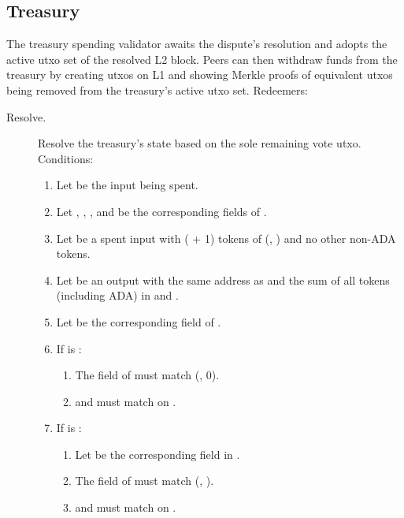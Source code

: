 \documentclass[../hydrozoa.tex]{subfiles}
\begin{document}
\subsection{Treasury}%
\label{h:rule-based-treasury}

The treasury spending validator awaits the dispute's resolution and adopts the active utxo set of the resolved L2 block.
Peers can then withdraw funds from the treasury by creating utxos on L1 and showing Merkle proofs of equivalent utxos being removed from the treasury's active utxo set.
Redeemers:
\begin{description}
  \item[Resolve.] Resolve the treasury's state based on the sole remaining vote utxo.
    Conditions:
    \begin{enumerate}
      \item Let  be the input being spent.
      \item Let , , , and  be the corresponding fields of .
      \item Let  be a spent input with ( + 1) tokens of (, ) and no other non-ADA tokens.
      \item Let  be an output with the same address as  and the sum of all tokens (including ADA) in  and .
      \item Let  be the corresponding field of .
      \item If  is :
        \begin{enumerate}
          \item The  field of  must match (, 0).
          \item {} and  must match on .
        \end{enumerate}
      \item If  is :
        \begin{enumerate}
          \item Let  be the corresponding field in .
          \item The  field of  must match (, ).
          \item {} and  must match on .

\end{enumerate}
\end{enumerate}
\end{description}
\end{document}
